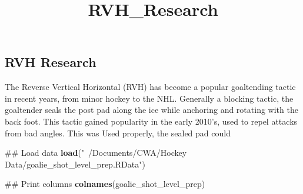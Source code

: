 \documentclass[]{article}
\title{RVH\_Research}
\author{}
\date{}
\newenvironment{Shaded}{\begin{snugshade}}{\end{snugshade}}
\newcommand{\KeywordTok}[1]{\textcolor[rgb]{0.13,0.29,0.53}{\textbf{#1}}}
\newcommand{\StringTok}[1]{\textcolor[rgb]{0.31,0.60,0.02}{#1}}
\newcommand{\NormalTok}[1]{#1}
\begin{document}
\maketitle

\subsection{RVH Research}\label{rvh-research}

The Reverse Vertical Horizontal (RVH) has become a popular goaltending
tactic in recent years, from minor hockey to the NHL. Generally a
blocking tactic, the goaltender seals the post pad along the ice while
anchoring and rotating with the back foot. This tactic gained popularity
in the early 2010's, used to repel attacks from bad angles. This was
Used properly, the sealed pad could

\begin{Shaded}
\begin{Highlighting}[]
\NormalTok{## Load data}
\KeywordTok{load}\NormalTok{(}\StringTok{"~/Documents/CWA/Hockey Data/goalie_shot_level_prep.RData"}\NormalTok{)}

\NormalTok{## Print columns}
\KeywordTok{colnames}\NormalTok{(goalie_shot_level_prep)}
\end{Highlighting}
\end{Shaded}
\end{document}
